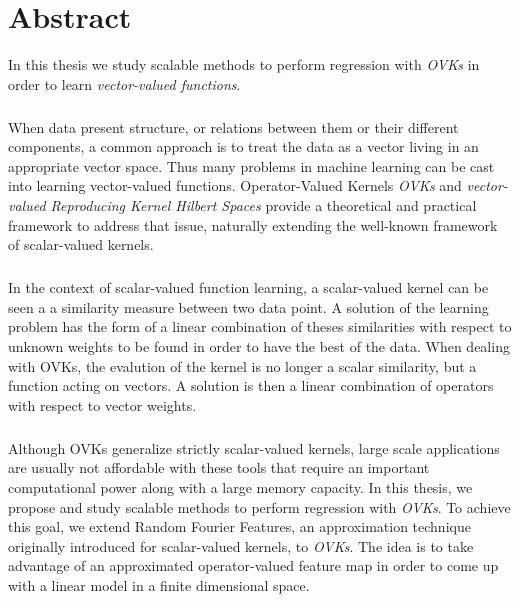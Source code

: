 


\begingroup
\let\clearpage\relax
\let\cleardoublepage\relax
\let\cleardoublepage\relax

\chapter*{Abstract}
In this thesis we study scalable methods to perform regression with \emph{\acl{OVK}s} in order to learn \emph{vector-valued functions}.
\paragraph{}
When data present structure, or relations between them or their different components, a common approach is to treat the data as a vector living in an appropriate vector space. Thus many problems in machine learning can be cast into learning vector-valued functions. Operator-Valued Kernels \emph{\acl{OVK}s} and \emph{vector-valued Reproducing Kernel Hilbert Spaces} provide a theoretical and practical framework to address that issue, naturally extending the well-known framework of scalar-valued kernels.
\paragraph{}
In the context of scalar-valued function learning, a scalar-valued kernel can be seen a a similarity measure between two data point. A solution of the learning problem has the form of a linear combination of theses similarities with respect to unknown weights to be found in order to have the best  of the data. When dealing with \acl{OVK}s, the evalution of the kernel is no longer a scalar similarity, but a function acting on vectors. A solution is then a linear combination of operators with respect to vector weights.
\paragraph{}
Although \acl{OVK}s generalize strictly scalar-valued kernels, large scale applications are usually not affordable with these tools that require an important computational power along with a large memory capacity. In this thesis, we propose and study scalable methods to perform regression with \emph{\acl{OVK}s}. To achieve this goal, we extend Random Fourier Features, an approximation technique originally introduced for scalar-valued kernels, to \emph{\acl{OVK}s}. The idea is to take advantage of an approximated operator-valued feature map in order to come up with a linear model in a finite dimensional space.
